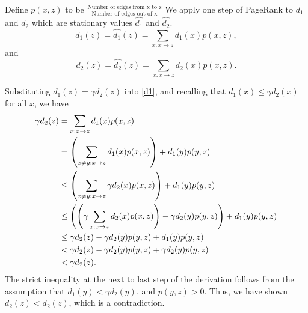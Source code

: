 \documentclass[12pt,twoside]{article}
\begin{document}
\begin{problem}{15}
{  Define $p(x,z)$ to be $\frac{\text{Number of edges from x to z}}{\text{Number of edges out of x}}$
  We apply one step of PageRank to $d_1$ and $d_2$ which are stationary values $\widehat{d_1}$ and $\widehat{d_2}$.
  \begin{equation}\label{d1}
    d_1(z) = \widehat{d_1}(z) = \sum_{x: x\rightarrow z} d_1(x) p(x,z),
  \end{equation}
  and
  \begin{equation}\label{d2}
    d_2(z) = \widehat{d_2}(z) = \sum_{x: x\rightarrow z} d_2(x) p(x,z).
  \end{equation}

  Substituting $d_1(z) = \gamma d_2(z)$ into \eqref{d1}, and recalling
  that $d_1(x) \leq \gamma d_2(x)$ for all $x$, we have
  \begin{align*}
    \gamma d_2(z)
        &= \sum_{x: x\rightarrow z} d_1(x) p(x,z) \\
        &= \left(\sum_{x \neq y: x\rightarrow z}
          d_1(x)p(x,z)\right) + d_1(y) p(y,z) \\
        &\leq \left(\sum_{x \neq y: x\rightarrow z} \gamma d_2(x)
          p(x,z)\right) + d_1(y) p(y,z) \\
        &\leq \left(\left(\gamma \sum_{x: x\rightarrow z} d_2(x)
          p(x,z)\right) - \gamma d_2(y)p(y,z)\right) + d_1(y) p(y,z) \\
        &\leq \gamma d_2(z) - \gamma d_2(y)p(y,z) + d_1(y) p(y,z)\\
        &< \gamma d_2(z) - \gamma d_2(y)p(y,z) + \gamma d_2(y) p(y,z)\\
        &< \gamma d_2(z).
  \end{align*}
  The strict inequality at the next to last step of the derivation
  follows from the assumption that $d_1(y) < \gamma d_2(y)$, and
  $p(y,z) > 0$.  Thus, we have shown $d_2(z) < d_2(z)$, which is a
  contradiction.
}

\eparts

\end{problem}


\end{document}
